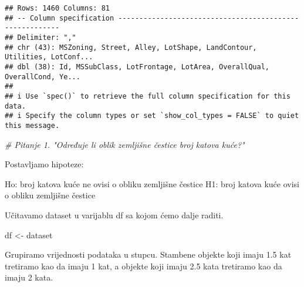 \documentclass[
]{article}
\newenvironment{Shaded}{\begin{snugshade}}{\end{snugshade}}
\newcommand{\CommentTok}[1]{\textcolor[rgb]{0.56,0.35,0.01}{\textit{#1}}}
\newcommand{\NormalTok}[1]{#1}
\newcommand{\OtherTok}[1]{\textcolor[rgb]{0.56,0.35,0.01}{#1}}
\begin{document}
\begin{verbatim}
## Rows: 1460 Columns: 81
## -- Column specification --------------------------------------------------------
## Delimiter: ","
## chr (43): MSZoning, Street, Alley, LotShape, LandContour, Utilities, LotConf...
## dbl (38): Id, MSSubClass, LotFrontage, LotArea, OverallQual, OverallCond, Ye...
## 
## i Use `spec()` to retrieve the full column specification for this data.
## i Specify the column types or set `show_col_types = FALSE` to quiet this message.
\end{verbatim}

\begin{Shaded}
\begin{Highlighting}[]
\CommentTok{\# Pitanje 1. "Određuje li oblik zemljišne čestice broj katova kuće?"}
\end{Highlighting}
\end{Shaded}

Postavljamo hipoteze:

Ho: broj katova kuće ne ovisi o obliku zemljišne čestice H1: broj katova
kuće ovisi o obliku zemljišne čestice

Učitavamo dataset u varijablu df sa kojom ćemo dalje raditi.

\begin{Shaded}
\begin{Highlighting}[]
\NormalTok{df }\OtherTok{\textless{}{-}}\NormalTok{ dataset}
\end{Highlighting}
\end{Shaded}

Grupiramo vrijednosti podataka u stupcu. Stambene objekte koji imaju 1.5
kat tretiramo kao da imaju 1 kat, a objekte koji imaju 2.5 kata
tretiramo kao da imaju 2 kata.
\end{document}
